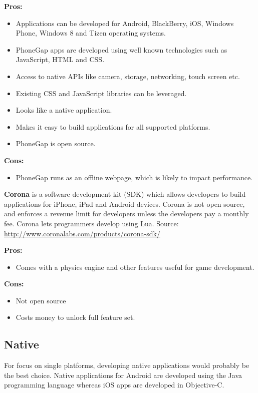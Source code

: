 \indent
  {\bf Pros:}
  \begin{itemize}
    \item Applications can be developed for Android, BlackBerry, iOS,
          Windows Phone, Windows 8 and Tizen operating systems.
    \item PhoneGap apps are developed using well known technologies such as
          JavaScript, HTML and CSS.
    \item Access to native APIs like camera, storage, networking,
          touch screen etc.
    \item Existing CSS and JavaScript libraries can be leveraged.
    \item Looks like a native application.
    \item Makes it easy to build applications for all supported platforms.
    \item PhoneGap is open source.
  \end{itemize}

\indent
{\bf Cons:}
  \begin{itemize}
    \item PhoneGap runs as an offline webpage, which is likely to impact
          performance.
  \end{itemize}

\noindent
{\bf Corona} is a software development kit (SDK) which allows developers to
build applications for iPhone, iPad and Android devices. Corona is not open
source, and enforces a revenue limit for developers unless the developers pay a
monthly fee. Corona lets programmers develop using Lua.
Source: \url{http://www.coronalabs.com/products/corona-sdk/}

\indent
  {\bf Pros:}
  \begin{itemize}
    \item Comes with a physics engine and other features useful for game
          development.
  \end{itemize}

\indent
  {\bf Cons:}
  \begin{itemize}
    \item Not open source
    \item Costs money to unlock full feature set.
  \end{itemize}

\subsection{Native}
For focus on single platforms, developing native applications would probably be
the best choice. Native applications for Android are developed using the Java
programming language whereas iOS apps are developed in Objective-C.

